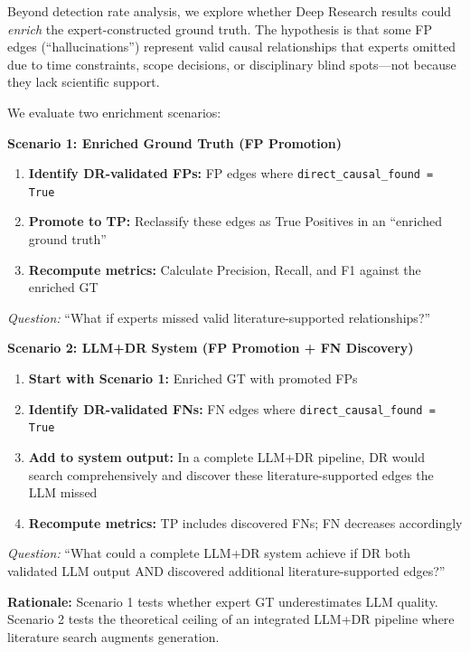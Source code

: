 Beyond detection rate analysis, we explore whether Deep Research results could \textit{enrich} the expert-constructed ground truth. The hypothesis is that some FP edges (``hallucinations'') represent valid causal relationships that experts omitted due to time constraints, scope decisions, or disciplinary blind spots---not because they lack scientific support.

We evaluate two enrichment scenarios:

\textbf{Scenario 1: Enriched Ground Truth (FP Promotion)}
\begin{enumerate}[noitemsep]
    \item \textbf{Identify DR-validated FPs:} FP edges where \texttt{direct\_causal\_found = True}
    \item \textbf{Promote to TP:} Reclassify these edges as True Positives in an ``enriched ground truth''
    \item \textbf{Recompute metrics:} Calculate Precision, Recall, and F1 against the enriched GT
\end{enumerate}

\textit{Question:} ``What if experts missed valid literature-supported relationships?''

\textbf{Scenario 2: LLM+DR System (FP Promotion + FN Discovery)}
\begin{enumerate}[noitemsep]
    \item \textbf{Start with Scenario 1:} Enriched GT with promoted FPs
    \item \textbf{Identify DR-validated FNs:} FN edges where \texttt{direct\_causal\_found = True}
    \item \textbf{Add to system output:} In a complete LLM+DR pipeline, DR would search comprehensively and discover these literature-supported edges the LLM missed
    \item \textbf{Recompute metrics:} TP includes discovered FNs; FN decreases accordingly
\end{enumerate}

\textit{Question:} ``What could a complete LLM+DR system achieve if DR both validated LLM output AND discovered additional literature-supported edges?''

\textbf{Rationale:} Scenario 1 tests whether expert GT underestimates LLM quality. Scenario 2 tests the theoretical ceiling of an integrated LLM+DR pipeline where literature search augments generation.

